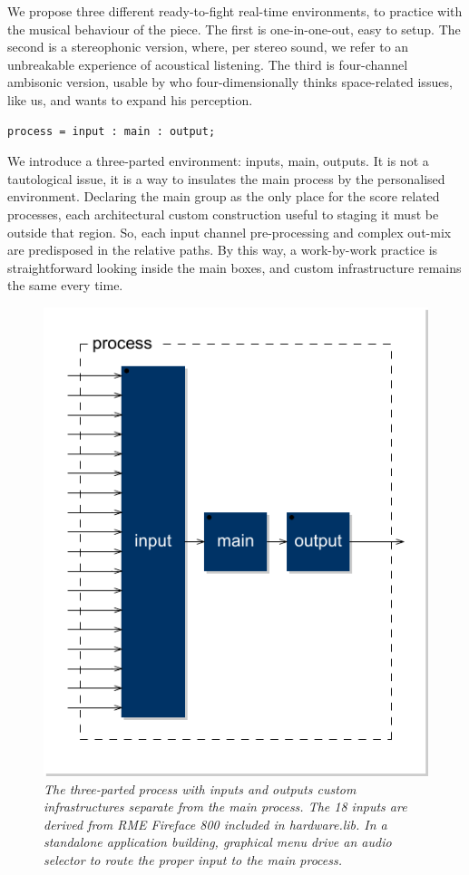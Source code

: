 \documentclass[twoside,a4paper]{article}
\begin{document}
We propose three different ready-to-fight real-time environments, to practice with the musical behaviour of the piece. The first is one-in-one-out, easy to setup. The second is a stereophonic version, where, per stereo sound, we refer to an unbreakable experience of acoustical listening. \cite{ab58} The third is four-channel ambisonic version, usable by who four-dimensionally thinks space-related issues, like us, and wants to expand his perception. 

\begin{lstlisting}
process = input : main : output;
\end{lstlisting}

We introduce a three-parted environment: inputs, main, outputs. It is not a tautological issue, it is a way to insulates the main process by the personalised environment. Declaring the main group as the only place for the score related processes, each architectural custom construction useful to staging it must be outside that region. So, each input channel pre-processing and complex out-mix are predisposed in the relative paths. By this way, a work-by-work practice is straightforward looking inside the main boxes, and custom infrastructure remains the same every time. 

\begin{figure}[ht]
\centerline{\includegraphics[width=.45\textwidth]{img/lais-process}}
\caption{\label{re-dia-6c}{\it The three-parted process with inputs and outputs custom infrastructures separate from the main process. The 18 inputs are derived from \emph{RME Fireface 800} included in \emph{hardware.lib}. In a standalone application building, graphical menu drive an audio selector to route the proper input to the main process.}}
\end{figure}

\end{document}
